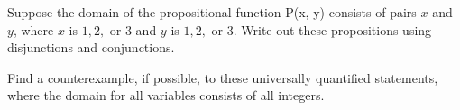 \documentclass[a4paper]{exam}
\begin{document}
\begin{questions}
  \question Suppose the domain of the propositional function P(x, y) consists of pairs $x$ and $y$, where $x$ is $1,2,$ or $3$ and $y$ is $1,2,$ or $3$. Write out these propositions using disjunctions and conjunctions.
  
  \question Find a counterexample, if possible, to these universally quantified statements, where the domain for all variables consists of all integers.
\end{questions}
\end{document}
